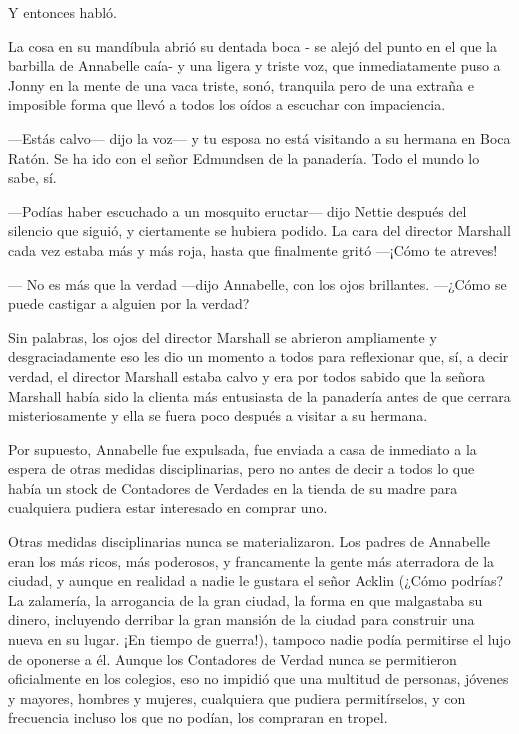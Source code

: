 Y entonces habló.

La cosa en su mandíbula abrió su dentada boca - se alejó del punto en el
que la barbilla de Annabelle caía- y una ligera y triste voz, que
inmediatamente puso a Jonny en la mente de una vaca triste, sonó,
tranquila pero de una extraña e imposible forma que llevó a todos los
oídos a escuchar con impaciencia.

---Estás calvo--- dijo la voz--- y tu esposa no está visitando a su
hermana en Boca Ratón. Se ha ido con el señor Edmundsen de la panadería.
Todo el mundo lo sabe, sí.

---Podías haber escuchado a un mosquito eructar--- dijo Nettie después
del silencio que siguió, y ciertamente se hubiera podido. La cara del
director Marshall cada vez estaba más y más roja, hasta que finalmente
gritó ---¡Cómo te atreves!

--- No es más que la verdad ---dijo Annabelle, con los ojos brillantes.
---¿Cómo se puede castigar a alguien por la verdad?

Sin palabras, los ojos del director Marshall se abrieron ampliamente y
desgraciadamente eso les dio un momento a todos para reflexionar que,
sí, a decir verdad, el director Marshall estaba calvo y era por todos
sabido que la señora Marshall había sido la clienta más entusiasta de la
panadería antes de que cerrara misteriosamente y ella se fuera poco
después a visitar a su hermana.

Por supuesto, Annabelle fue expulsada, fue enviada a casa de inmediato a
la espera de otras medidas disciplinarias, pero no antes de decir a
todos lo que había un stock de Contadores de Verdades en la tienda de su
madre para cualquiera pudiera estar interesado en comprar uno.

Otras medidas disciplinarias nunca se materializaron. Los padres de
Annabelle eran los más ricos, más poderosos, y francamente la gente más
aterradora de la ciudad, y aunque en realidad a nadie le gustara el
señor Acklin (¿Cómo podrías? La zalamería, la arrogancia de la gran
ciudad, la forma en que malgastaba su dinero, incluyendo derribar la
gran mansión de la ciudad para construir una nueva en su lugar. ¡En
tiempo de guerra!), tampoco nadie podía permitirse el lujo de oponerse a
él. Aunque los Contadores de Verdad nunca se permitieron oficialmente en
los colegios, eso no impidió que una multitud de personas, jóvenes y
mayores, hombres y mujeres, cualquiera que pudiera permitírselos, y con
frecuencia incluso los que no podían, los compraran en tropel.

